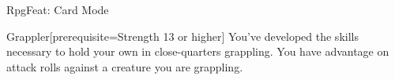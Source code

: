 \begin{ExampleBlock}{RpgFeat: Card Mode}
\begin{RpgFeat}[width=5.5cm, height=7.5cm, color=DmgCoral]{Grappler}[prerequisite={Strength 13 or higher}]
    You've developed the skills necessary to hold your own in close-quarters grappling. You have advantage on attack rolls against a creature you are grappling.
\end{RpgFeat}


\end{ExampleBlock}
